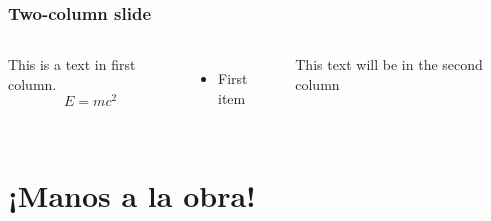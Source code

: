 \documentclass{beamer}
\begin{document}
\begin{frame}
\frametitle{Two-column slide}

\begin{columns}

This is a text in first column.
$$E=mc^2$$
\begin{itemize}
\item First item

\end{itemize}

This text will be in the second column

\end{columns}
\end{frame}
\section{¡Manos a la obra!}
\end{document}
